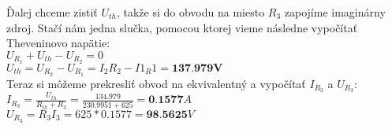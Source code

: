 \newline
Ďalej chceme zistiť $U_{th}$, takže si do obvodu na miesto $R_3$ zapojíme imaginárny zdroj. Stačí nám jedna slučka, pomocou ktorej vieme následne vypočítať Theveninovo napätie: \\
\newline
$U_{R_1} + U_{th} - U_{R_2} = 0$ \\
$U_{th} = U_{R_2} - U_{R_1} = I_2R_2 - I1_R1 = \textbf{137.979V}$ \\
\newline
\newline
Teraz si môžeme prekresliť obvod na ekvivalentný a vypočítať $I_{R_3}$ a $U_{R_3}$: \\
\newline
$I_{R_3} = \frac{U_{th}}{R_{th} + R_3} = \frac{134.979}{230.9951 + 625} = \textbf{0.1577}A$ \\
\newline
$U_{R_3} = R_3I_3 = 625 * 0.1577 = \textbf{98.5625}V$ \\
\newline

